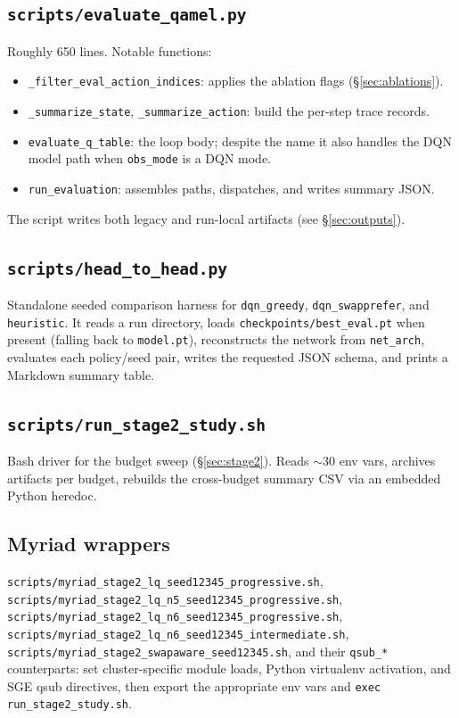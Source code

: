 \documentclass[11pt]{article}
\newcommand{\code}[1]{\texttt{#1}}
\newcommand{\file}[1]{\texttt{\small #1}}
\begin{document}
\subsection{\file{scripts/evaluate\_qamel.py}}
Roughly 650 lines. Notable functions:
\begin{itemize}
  \item \code{\_filter\_eval\_action\_indices}: applies the ablation flags (\S\ref{sec:ablations}).
  \item \code{\_summarize\_state}, \code{\_summarize\_action}: build the per-step trace records.
  \item \code{evaluate\_q\_table}: the loop body; despite the name it also handles the DQN model path when \code{obs\_mode} is a DQN mode.
  \item \code{run\_evaluation}: assembles paths, dispatches, and writes summary JSON.
\end{itemize}
The script writes both legacy and run-local artifacts (see \S\ref{sec:outputs}).

\subsection{\file{scripts/head\_to\_head.py}}
Standalone seeded comparison harness for \code{dqn\_greedy}, \code{dqn\_swapprefer}, and \code{heuristic}. It reads a run directory, loads \file{checkpoints/best\_eval.pt} when present (falling back to \file{model.pt}), reconstructs the network from \code{net\_arch}, evaluates each policy/seed pair, writes the requested JSON schema, and prints a Markdown summary table.

\subsection{\file{scripts/run\_stage2\_study.sh}}
Bash driver for the budget sweep (\S\ref{sec:stage2}). Reads $\sim$30 env vars, archives artifacts per budget, rebuilds the cross-budget summary CSV via an embedded Python heredoc.

\subsection{Myriad wrappers}
\file{scripts/myriad\_stage2\_lq\_seed12345\_progressive.sh}, \file{scripts/myriad\_stage2\_lq\_n5\_seed12345\_progressive.sh}, \file{scripts/myriad\_stage2\_lq\_n6\_seed12345\_progressive.sh}, \file{scripts/myriad\_stage2\_lq\_n6\_seed12345\_intermediate.sh}, \file{scripts/myriad\_stage2\_swapaware\_seed12345.sh}, and their \code{qsub\_*} counterparts: set cluster-specific module loads, Python virtualenv activation, and SGE qsub directives, then export the appropriate env vars and \code{exec} \file{run\_stage2\_study.sh}.
\end{document}

